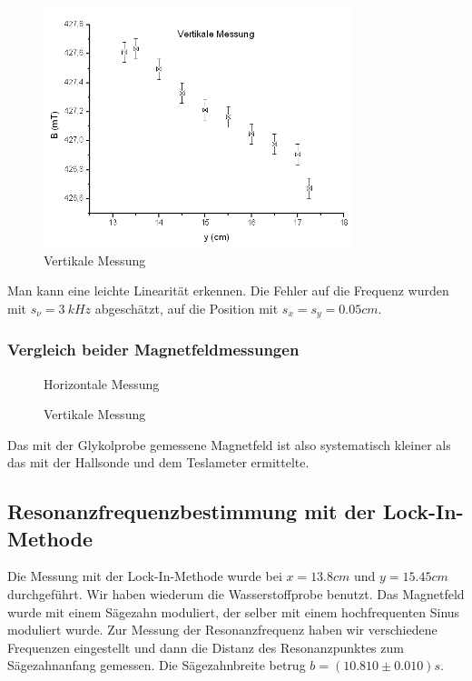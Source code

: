 \begin{figure}[H]
\centering \includegraphics[width=0.8\textwidth]{Bilder/homvert.png}
\caption{Vertikale Messung}
\end{figure}

Man kann eine leichte Linearität erkennen. Die Fehler auf die Frequenz wurden mit $s_\nu=3\ kHz$ abgeschätzt, auf die Position mit $s_x=s_y=0.05cm$.

\subsubsection{Vergleich beider Magnetfeldmessungen}

\begin{figure}[H]
\centering %
\caption{Horizontale Messung}
\end{figure}

\begin{figure}[H]
\centering %
\caption{Vertikale Messung}
\end{figure}

Das mit der Glykolprobe gemessene Magnetfeld ist also systematisch kleiner als das mit der Hallsonde und dem Teslameter ermittelte. %

\subsection{Resonanzfrequenzbestimmung mit der Lock-In-Methode}

Die Messung mit der Lock-In-Methode wurde bei $x=13.8cm$ und $y=15.45cm$ durchgeführt. Wir haben wiederum die Wasserstoffprobe benutzt. Das Magnetfeld wurde mit einem Sägezahn moduliert, der selber mit einem hochfrequenten Sinus moduliert wurde. Zur Messung der Resonanzfrequenz haben wir verschiedene Frequenzen eingestellt und dann die Distanz des Resonanzpunktes zum Sägezahnanfang gemessen. Die Sägezahnbreite betrug $b = (10.810 \pm 0.010)s$. 

